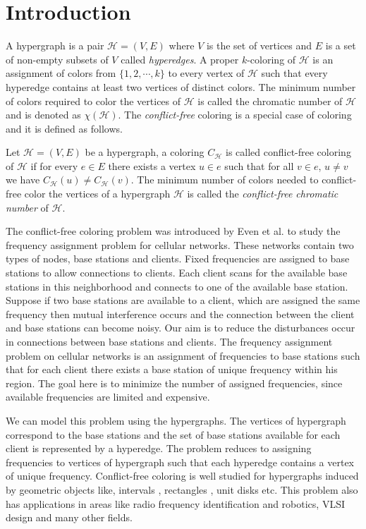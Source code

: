 \documentclass[svgnames]{llncs}
\begin{document}
\section{Introduction}
A hypergraph is a pair $ \mathcal{H}=(V, E)$ where $V$ is the set of vertices and $E$ is a set of non-empty subsets of $V$ called \emph{hyperedges}.  
A proper $k$-coloring of $\mathcal{H}$ is an assignment of colors from $\{1,2, \cdots, k\}$ to every vertex of $\mathcal{H}$ such that every hyperedge contains at least two vertices of distinct colors.  
The minimum number of colors required to color the vertices of
$\mathcal{H}$ is called the chromatic number of $\mathcal{H}$ and is denoted as $\chi( \mathcal{H})$.
The \emph{conflict-free} coloring is a special case of coloring and it is defined as follows.
\begin{definition}
 Let $ \mathcal{H}=(V, E)$ be a hypergraph, a coloring $C_\mathcal{H}$ is called conflict-free coloring of $\mathcal{H}$ if for every $e \in E$
there exists a vertex $u \in e$ such that for all $v\in e$, $u \neq v$ we have $C_\mathcal{H}(u) \neq C_\mathcal{H}(v )$.  
The minimum number of colors needed to conflict-free color the vertices of a
hypergraph $\mathcal{H}$ is called the \emph{conflict-free chromatic number} of $\mathcal{H}$.
\end{definition}
The conflict-free coloring problem was introduced by Even et al. \cite{even2003conflict}   
to study the frequency assignment problem for cellular networks.
These networks contain two types of nodes, base stations and clients. Fixed frequencies are assigned to base stations to allow connections to clients. Each client scans for the available base stations in this neighborhood and connects to one of the available base station. 
Suppose if two base stations are available to a client, which are assigned the same frequency then mutual interference occurs and the connection between the client and base stations can become noisy. Our aim is to reduce the disturbances occur in connections between base stations and clients. The frequency assignment problem on cellular networks is an assignment of frequencies to base stations such that for 
each client there exists a base station of unique frequency within his region. The
goal here is to minimize the number of assigned frequencies, since available frequencies are limited and expensive. 

We can model this problem using the hypergraphs. The vertices of hypergraph correspond to the base stations and the set of base stations available for each client is represented by a hyperedge. The problem reduces to assigning frequencies to vertices of hypergraph such that each hyperedge contains a vertex of unique frequency.   
Conflict-free coloring is well studied for hypergraphs induced by geometric objects like, intervals \cite{bar2008deterministic}, rectangles \cite{ajwani2007conflict}, unit disks \cite{lev2009conflict} etc. 
This problem also has applications in areas like radio frequency identification and robotics, VLSI design and many other fields.
\end{document}
